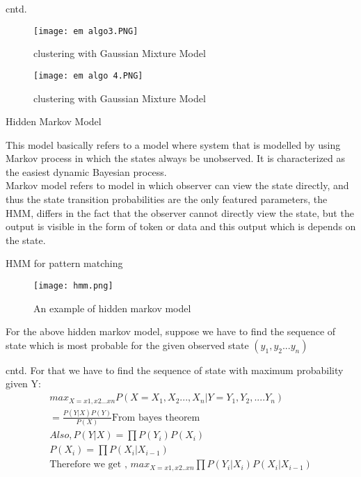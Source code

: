 \documentclass{beamer}
\begin{document}
\begin{frame}{cntd.}
\begin{figure}
    \centering
    \texttt{[image: em algo3.PNG]}
    \caption{clustering with Gaussian Mixture Model}
    \end{figure}
    \begin{figure}
    \centering
    \texttt{[image: em algo 4.PNG]}
    \caption{clustering with Gaussian Mixture Model}
    \end{figure}
    
\end{frame}
\begin{frame}{Hidden Markov Model}
\begin{block}{}
    

This model basically refers to a model where system that is
modelled by using Markov process in which the states always
be unobserved. It is characterized as the easiest dynamic
Bayesian process.\\
Markov model refers to model in which observer can view
the state directly, and thus the state transition probabilities are
the only featured parameters, the HMM, differs in the fact that
the observer cannot directly view the state, but the output is
visible in the form of token or data and this output which is
depends on the state. 
    \end{block}
\end{frame}
\begin{frame}{HMM for pattern matching}
\begin{figure}
    \centering
    \texttt{[image: hmm.png]}
    \caption{An example of hidden markov model}
    \end{figure}
    For the above hidden markov model, suppose we have to find the sequence of state which is most probable for the given observed state $(y_{1},y_{2}... y_{n})$
    
   
    
\end{frame}
\begin{frame}{cntd.}
For that we have to find the sequence of state with maximum probability given Y:
\begin{align}
    max_{X=x1,x2...xn} P(X=X_{1},X_{2}..., X_{n} | Y=Y_{1},Y_{2},....Y_{n})\\
      = \frac{P(Y|X)P(Y)}{P(X)}  \text{From bayes theorem}\\
     Also,  P(Y|X) = \prod P(Y_{i})P(X_{i})\\
      P(X_{i})=\prod P(X_{i}| X_{i-1})\\
     \text{Therefore we get , }max_{X=x1,x2..xn} \prod P(Y_{i}|X_{i})P(X_{i}|X_{i-1})
\end{align}
   
\end{frame}
\end{document}
